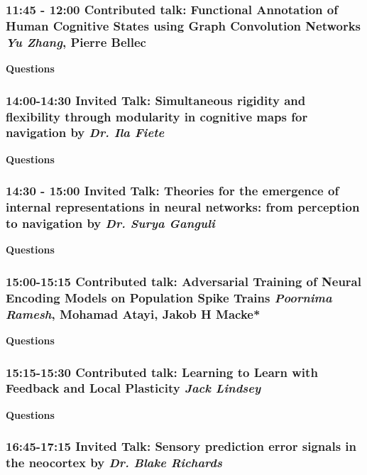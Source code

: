 \documentclass[12pt]{article}
\begin{document}
\subsubsection{11:45 - 12:00 Contributed talk:  Functional Annotation of Human Cognitive States using Graph Convolution Networks \textit{Yu Zhang}, Pierre Bellec}

\textbf{Questions} 


\subsubsection{14:00-14:30 Invited Talk: Simultaneous rigidity and flexibility through modularity in cognitive maps for navigation by \textit{Dr. Ila Fiete}}

\textbf{Questions} 


\subsubsection{14:30 - 15:00 Invited Talk: Theories for the emergence of internal representations in neural networks: from perception to navigation by \textit{Dr. Surya Ganguli}}

\textbf{Questions} 


\subsubsection{15:00-15:15 Contributed talk: Adversarial Training of Neural Encoding Models on Population Spike Trains \textit{Poornima Ramesh}, Mohamad Atayi, Jakob H Macke*}

\textbf{Questions} 


\subsubsection{15:15-15:30 Contributed talk: Learning to Learn with Feedback and Local Plasticity \textit{Jack Lindsey}}

\textbf{Questions} 


\subsubsection{16:45-17:15 Invited Talk: Sensory prediction error signals in the neocortex by \textit{Dr. Blake Richards}}
\end{document}
